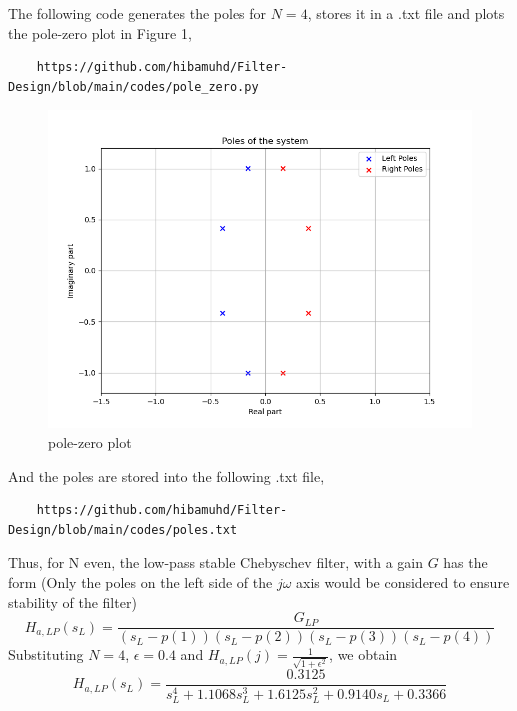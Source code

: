 \documentclass{article}
\begin{document}
\begin{enumerate}
The following code generates the poles for $N=4$, stores it in a .txt file and plots the pole-zero plot in Figure 1,
\begin{lstlisting}
    https://github.com/hibamuhd/Filter-Design/blob/main/codes/pole_zero.py
\end{lstlisting}
\begin{figure}[h!]
    \centering
    \includegraphics[width=\columnwidth]{figs/pole_zero.png}
    \caption{pole-zero plot}
    \label{fig:p0}
\end{figure}
And the poles are stored into the following .txt file,
\begin{lstlisting}
    https://github.com/hibamuhd/Filter-Design/blob/main/codes/poles.txt
\end{lstlisting}

Thus, for N even, the low-pass stable Chebyschev filter, with a gain $G$ has the form (Only the poles on the left side of the $j\omega$ axis would be considered to ensure stability of the filter)
\begin{equation}
\label{poleleft}
H_{a,LP}(s_L) = \frac{G_{LP}}{(s_L-p(1))(s_L-p(2))(s_L-p(3))(s_L-p(4))}
\end{equation}
Substituting $N = 4$, $\epsilon = 0.4$ and $H_{a,LP}(j) = \frac{1}{\sqrt{1+\epsilon^2}}$, we obtain 
\begin{equation}
\label{lpfinal}
H_{a,LP}(s_L) = \frac{0.3125}{s_L^4 + 1.1068s_L^3 + 1.6125s_L^2+0.9140s_L + 0.3366}
\end{equation}


\end{enumerate}
\end{document}
